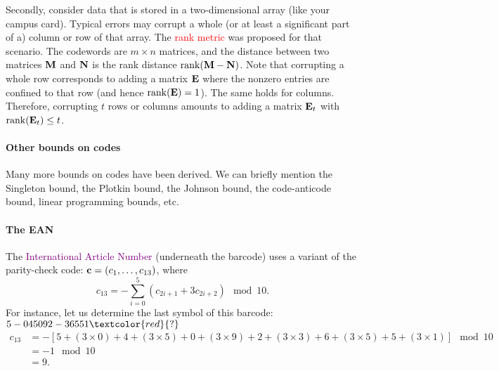\documentclass[a4paper, 11pt, openany]{book}
\numberwithin{equation}{section}
\theoremstyle{plain}
\theoremstyle{definition}
\newcommand{\Important}[1]{\textcolor{red}{#1}}
\newcommand{\Define}[1]{\textcolor{purple}{#1}}
\begin{document}
Secondly, consider data that is stored in a two-dimensional array (like your campus card). Typical errors may corrupt a whole (or at least a significant part of a) column or row of that array. The \Important{rank metric} was proposed for that scenario. The codewords are $m \times n$ matrices, and the distance between two matrices ${\bf M}$ and ${\bf N}$ is the rank distance $\mathrm{rank}({\bf M} - {\bf N})$. Note that corrupting a whole row corresponds to adding a matrix ${\bf E}$ where the nonzero entries are confined to that row (and hence $\mathrm{rank}({\bf E}) = 1$). The same holds for columns. Therefore, corrupting $t$ rows or columns amounts to adding a matrix ${\bf E}_t$ with $\mathrm{rank}({\bf E}_t) \le t$.

\paragraph{Other bounds on codes}
Many more bounds on codes have been derived. We can briefly mention the Singleton bound, the Plotkin bound, the Johnson bound, the code-anticode bound, linear programming bounds, etc.


\paragraph{The EAN}
The \Define{International Article Number} (underneath the barcode) uses a variant of the parity-check code: ${\bf c} = (c_1,\ldots,c_{13})$, where
\[
	c_{13} = -\sum_{i=0}^5 (c_{2i+1} + 3c_{2i+2}) \mod 10.
\]
For instance, let us determine the last symbol of this barcode: $5-045092-36551\Important{?}$
\begin{align*}
	c_{13} &= -\left[5 + (3 \times 0) + 4 + (3 \times 5) + 0 + (3 \times 9) + 2 + (3 \times 3) + 6 + (3 \times 5) + 5 + (3 \times 1)  \right] \mod 10\\
	&= -1 \mod 10\\
	&= 9.
\end{align*}

\end{document}
